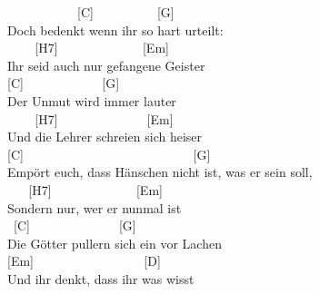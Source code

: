 \documentclass[
  letterpaper,
]{scrbook}
\begin{document}
~ ~ ~ ~ ~ ~ ~{[}C{]} ~ ~ ~ ~ ~ ~{[}G{]} ~ ~ ~ ~ ~ ~ ~\\
Doch bedenkt wenn ihr so hart urteilt:\\
\hspace*{0.333em} ~ ~ ~{[}H7{]} ~ ~ ~ ~ ~ ~ ~ ~{[}Em{]}\\
Ihr seid auch nur gefangene Geister\\
\hspace*{0.333em} {[}C{]} ~ ~ ~ ~ ~ ~ ~ {[}G{]}\\
Der Unmut wird immer lauter\\
\hspace*{0.333em} ~ ~ ~{[}H7{]} ~ ~ ~ ~ ~ ~ ~ ~ {[}Em{]}\\
Und die Lehrer schreien sich heiser\\
{[}C{]} ~ ~ ~ ~ ~ ~ ~ ~ ~ ~ ~ ~ ~ ~ ~ ~{[}G{]}\\
Empört euch, dass Hänschen nicht ist, was er sein soll,\\
\hspace*{0.333em} ~ ~ {[}H7{]} ~ ~ ~ ~ ~ ~ ~ ~{[}Em{]}\\
Sondern nur, wer er nunmal ist\\
\hspace*{0.333em} ~{[}C{]} ~ ~ ~ ~ ~ ~ ~ ~ {[}G{]}\\
Die Götter pullern sich ein vor Lachen\\
\hspace*{0.333em} {[}Em{]} ~ ~ ~ ~ ~ ~ ~ ~ ~ ~ {[}D{]}\\
Und ihr denkt, dass ihr was wisst
\end{document}
